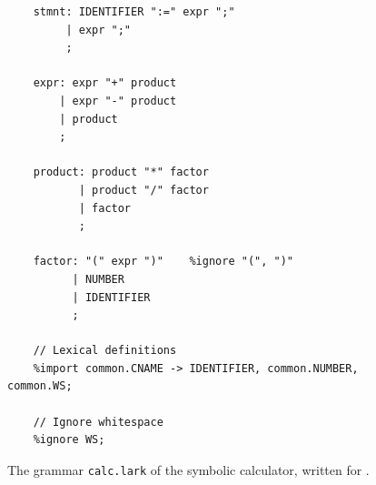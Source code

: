 \begin{figure}[!ht]
\centering
\begin{verbatim}
    stmnt: IDENTIFIER ":=" expr ";"
         | expr ";"
         ;

    expr: expr "+" product
        | expr "-" product
        | product
        ;

    product: product "*" factor
           | product "/" factor
           | factor
           ;

    factor: "(" expr ")"    %ignore "(", ")"
          | NUMBER
          | IDENTIFIER
          ;

    // Lexical definitions
    %import common.CNAME -> IDENTIFIER, common.NUMBER, common.WS;

    // Ignore whitespace
    %ignore WS;
\end{verbatim}
\vspace*{-0.3cm}
\caption{The grammar \texttt{calc.lark} of the symbolic calculator, written for .}
\label{fig:01-Calculator.ipynb:grammar}
\end{figure}


